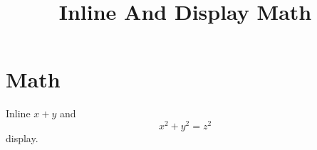 \documentclass{article}
\begin{document}
\title{Inline And Display Math}\maketitle
\section{Math} Inline $x+y$ and $$x^2+y^2=z^2$$ display.
\end{document}
